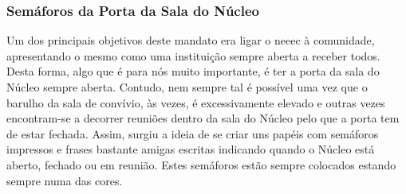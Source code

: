 
\subsubsection{Semáforos da Porta da Sala do Núcleo}

Um dos principais objetivos deste mandato era ligar o \acrshort{neeec} à comunidade, apresentando o mesmo como uma instituição sempre aberta a receber todos. Desta forma, algo que é para nós muito importante, é ter a porta da sala do Núcleo sempre aberta. Contudo, nem sempre tal é possível uma vez que o barulho da sala de convívio, às vezes, é excessivamente elevado e outras vezes encontram-se a decorrer reuniões dentro da sala do Núcleo pelo que a porta tem de estar fechada. Assim, surgiu a ideia de se criar uns papéis com semáforos impressos e frases bastante amigas escritas indicando quando o Núcleo está aberto, fechado ou em reunião. Estes semáforos estão sempre colocados estando sempre numa das cores.